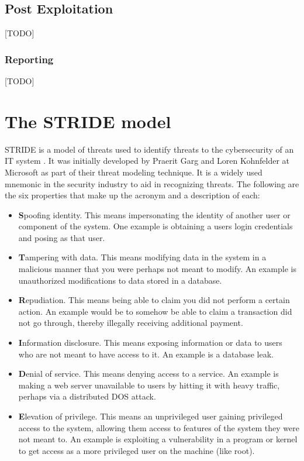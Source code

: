 \subsection{Post Exploitation}
[TODO]

\subsubsection{Reporting}
[TODO]

\section{The STRIDE model} \label{ch:method:stride}
STRIDE is a model of threats used to identify threats to the cybersecurity of an IT system \cite{stride}. It was initially developed by Praerit Garg and Loren Kohnfelder at Microsoft as part of their threat modeling technique. It is a widely used mnemonic in the security industry to aid in recognizing threats. The following are the six properties that make up the acronym and a description of each:
\begin{itemize}
    \item \textbf{S}poofing identity. This means impersonating the identity of another user or component of the system. One example is obtaining a users login credentials and posing as that user.
    \item \textbf{T}ampering with data. This means modifying data in the system in a malicious manner that you were perhaps not meant to modify. An example is unauthorized modifications to data stored in a database.
    \item \textbf{R}epudiation. This means being able to claim you did not perform a certain action. An example would be to somehow be able to claim a transaction did not go through, thereby illegally receiving additional payment.
    \item \textbf{I}nformation disclosure. This means exposing information or data to users who are not meant to have access to it. An example is a database leak.
    \item \textbf{D}enial of service. This means denying access to a service. An example is making a web server unavailable to users by hitting it with heavy traffic, perhaps via a distributed \gls{DOS} attack.
    \item \textbf{E}levation of privilege. This means an unprivileged user gaining privileged access to the system, allowing them access to features of the system they were not meant to. An example is exploiting a vulnerability in a program or kernel to get access as a more privileged user on the machine (like root).
\end{itemize}
